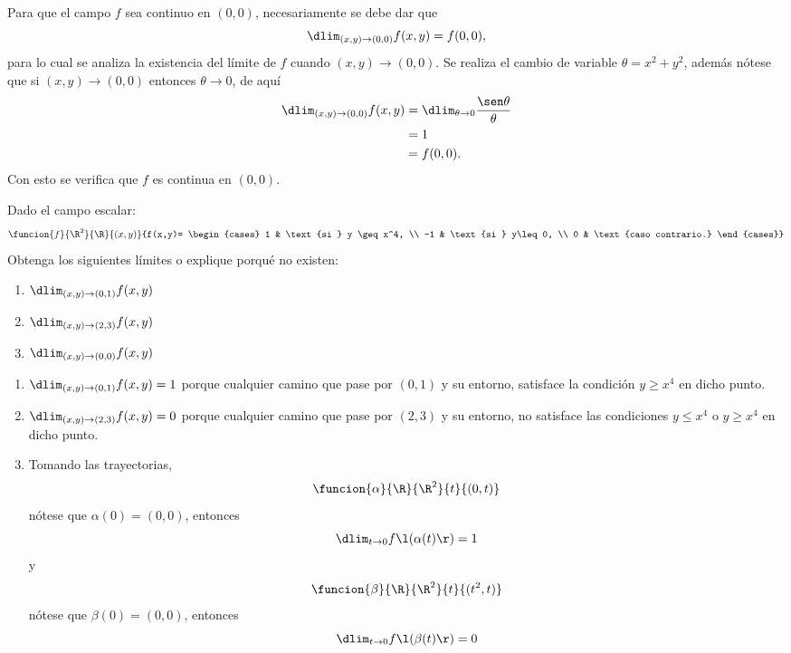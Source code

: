 \documentclass[a4,11pt]{aleph-examen}
\begin{document}
\begin{preguntas}
\begin{respuesta}
\begin{respuesta}
    Para que el campo $f$ sea continuo en $(0,0)$, necesariamente se debe dar que
    \[
        \dlim_{(x,y)\to (0,0)}f(x,y)=f(0,0),
    \]
    para lo cual se analiza la existencia del límite de $f$ cuando $(x,y)\to (0,0)$. Se realiza el cambio de variable $\theta=x^2+y^2$, además nótese que si $(x,y)\to (0,0)$ entonces $\theta \to 0$, de aquí
    \begin{align*}
        \dlim_{(x,y)\to (0,0)}f(x,y)&=\dlim_{\theta\to 0}\dfrac{\sen \theta}{\theta}\\
        &=1\\
        &=f(0,0).
    \end{align*}
    Con esto se verifica que $f$ es continua en $(0,0)$.
\end{respuesta}

\item
    Dado el campo escalar:
    \[
        \funcion{f}{\R^2}{\R}{(x,y)}{f(x,y)=
    \begin{cases}
         1 & \text{si } y \geq x^4, \\
         -1 & \text{si } y\leq0, \\
         0 & \text{caso contrario.}
    \end{cases}}
    \]
    Obtenga los siguientes límites o explique porqué no existen:
    \begin{enumerate}
        \item $\dlim_{(x,y) \to (0,1)} f(x,y)$
        \item $\dlim_{(x,y) \to (2,3)} f(x,y)$
        \item $\dlim_{(x,y) \to (0,0)} f(x,y)$
    \end{enumerate}
    \begin{respuesta}
        \begin{enumerate}
            \item $\dlim_{(x,y) \to (0,1)} f(x,y)=1$ porque cualquier camino que pase por $(0,1)$ y su entorno, satisface la condición $y \geq x^4$ en dicho punto.
            \item $\dlim_{(x,y) \to (2,3)} f(x,y)=0$ porque cualquier camino que pase por $(2,3)$ y su entorno, no satisface las condiciones $y \leq x^4$ o $y \geq x^4$ en dicho punto.
            \item Tomando las trayectorias,
                \[
                    \funcion{\alpha}{\R}{\R^2}{t}{(0,t)}
                \]
                nótese que $\alpha(0)=(0,0)$, entonces
                \[
                    \dlim_{t \to 0} f\l(\alpha(t)\r)=1
                \]
                y
                \[
                    \funcion{\beta}{\R}{\R^2}{t}{(t^2,t)}
                \]
                nótese que $\beta(0)=(0,0)$, entonces
                \[
                    \dlim_{t \to 0} f\l(\beta(t)\r)=0
                \]
                

\end{enumerate}
\end{respuesta}
\end{respuesta}
\end{preguntas}
\end{document}
